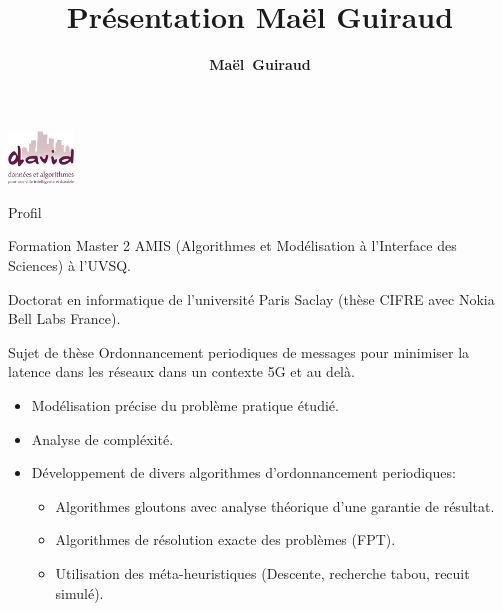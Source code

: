 \documentclass[10 pt]{beamer}
\title{ Présentation Maël Guiraud}
\author{{\bf Maël~Guiraud}}
\institute[DAVID-UVSQ] 
{
  DAVID, Universit\'e de Versailles Saint Quentin
   \\
}
\begin{document}
\begin{frame}

  \titlepage
  \centering
 \includegraphics [width=17.5mm]{logod.png} \\
\end{frame}






\begin{frame}{Profil}
\begin{block}{Formation}
Master 2 AMIS (Algorithmes et Modélisation à l'Interface des Sciences) à l'UVSQ.

Doctorat en informatique de l'université Paris Saclay (thèse CIFRE avec Nokia Bell Labs France).
\end{block}
\begin{exampleblock}{Sujet de thèse}
Ordonnancement periodiques de messages pour minimiser la latence dans les réseaux dans un contexte 5G et au delà.\\
\begin{itemize}
  \item Modélisation précise du problème pratique étudié.
  \item Analyse de compléxité.
  \item Développement de divers algorithmes d'ordonnancement periodiques:
  \begin{itemize}
  \item Algorithmes gloutons avec analyse théorique d'une garantie de résultat.
  \item Algorithmes de résolution exacte des problèmes (FPT).
  \item Utilisation des méta-heuristiques (Descente, recherche tabou, recuit simulé).
  \end{itemize}
  \end{itemize}
\end{exampleblock}

  
\end{frame}
\end{document}
